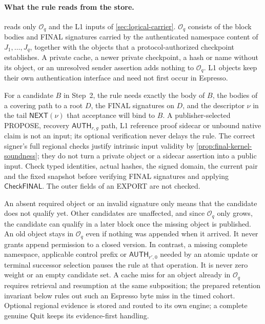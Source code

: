 \documentclass[11pt,a4paper]{article}
\newcommand{\tagg}[1]{\ensuremath{\mathsf{#1}}}
\newcounter{protocol}
\begin{document}
\paragraph{What the rule reads from the store.}
\label{sec:record-completeness}
 reads only $\mathcal O_q$ and the L1 inputs of
\cref{sec:logical-carrier}. $\mathcal O_q$ consists of the block bodies
and FINAL signatures carried by the authenticated namespace content of
$J_1,\ldots,J_q$, together with the objects that a protocol-authorized
checkpoint establishes. A private cache, a newer private checkpoint, a
hash or name without its object, or an unresolved sender assertion adds
nothing to $\mathcal O_q$. L1 objects keep their own authentication
interface and need not first occur in Espresso.

For a candidate $B$ in Step~2, the rule needs exactly the body of $B$,
the bodies of a covering path to a root $D$, the FINAL signatures on
$D$, and the descriptor $\nu$ in the tail $\tagg{NEXT}(\nu)$ that
acceptance will bind to
$B$. A publisher-selected PROPOSE,
recovery $\tagg{AUTH}_{r,g}$ path, L1 reference proof sidecar or unbound
native claim is not an input; its optional verification never delays the
rule. The correct signer's full regional checks justify intrinsic input
validity by \cref{prop:final-kernel-soundness}; they do not turn a
private object or a sidecar assertion into a public input. Check typed
identities, actual hashes, the signed domain, the current pair and the
fixed snapshot before verifying FINAL signatures and applying
\tagg{CheckFINAL}. The outer fields of an EXPORT are not checked.

An absent required object or an invalid signature only means that the
candidate does not qualify yet. Other candidates are unaffected, and
since $\mathcal O_q$ only grows, the candidate can qualify in a later
block once the missing object is published. An old object stays in
$\mathcal O_q$ even if nothing was appended when it arrived. It never
grants append permission to a closed version. In contrast, a missing
complete namespace, applicable control prefix or $\tagg{AUTH}_{r',0}$
needed by an atomic update or terminal successor selection pauses the rule at that
operation. It is never zero
weight or an empty candidate set. A cache miss for an object already in
$\mathcal O_q$ requires retrieval and resumption at the same
subposition; the prepared retention invariant below rules out such an
Espresso byte miss in the timed cohort. Optional regional evidence is
stored and routed to its own engine; a complete genuine Quit keeps its
evidence-first handling.
\end{document}
